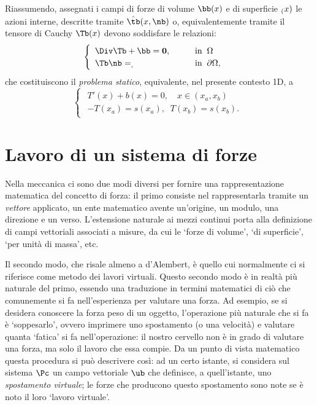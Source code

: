 Riassumendo, assegnati i campi di forze di volume $\bb(x)$ e di superficie $\sb(x)$ le azioni interne, descritte tramite $\hat\tb(x, \nb) $ o, equivalentemente tramite il tensore di Cauchy $\Tb(x)$ devono soddisfare le relazioni:
\begin{equation}
\begin{cases}
	\begin{array}{ll}
		\Div\Tb +\bb= \mathbf{0}, & \qquad \text{in}\;\; \Omega \\
		\Tb\nb=\sb, & \qquad \text{in}\;\; \partial\Omega,
	\end{array}
\end{cases}
\end{equation}
che costituiscono il \textit{problema statico}, equivalente, nel presente contesto 1D, a
\begin{equation}
	\begin{cases}
		\begin{array}{ll}
		T'(x)+b(x)=0, \quad  x\in(x_a,x_b) \\
		-T(x_a)=s(x_a),\;\;T(x_b)=s(x_b).
		\end{array}
	\end{cases}
\end{equation}



\section{Lavoro di un sistema di forze}\label{ELV1D}
Nella meccanica ci sono due modi diversi per fornire una rappresentazione matematica del concetto di forza: il primo consiste nel rappresentarla tramite un \textit{vettore} applicato, un ente matematico avente  un'origine, un modulo, una direzione e un verso. L'estensione naturale ai mezzi continui porta alla definizione di campi vettoriali associati a misure, da cui le `forze di volume', `di superficie', `per unità di massa', etc.

Il secondo modo, che risale almeno a d'Alembert, è quello cui normalmente ci si riferisce come metodo dei lavori virtuali. Questo secondo modo è in realtà più naturale del primo, essendo una traduzione in termini matematici di ciò che comunemente si fa nell'esperienza per valutare una forza. Ad esempio, se si desidera conoscere la forza peso di un oggetto, l'operazione più naturale che si fa è `soppesarlo', ovvero imprimere uno spostamento (o una velocità) e valutare quanta `fatica' si fa nell'operazione: il nostro cervello non è in grado di valutare una forza, ma solo il lavoro che essa compie. Da un punto di vista matematico questa procedura si può descrivere così: ad un certo istante, si considera sul sistema $\Pc$ un campo vettoriale $\ub$ che definisce, a quell'istante, uno \textit{spostamento virtuale}; le forze che producono questo spostamento sono note se è noto il loro `lavoro virtuale'. 

